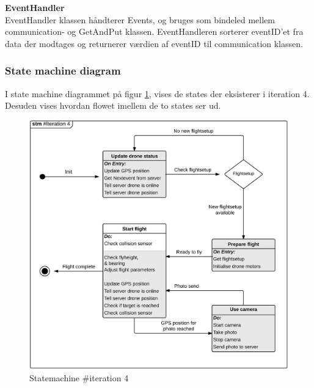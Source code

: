 \textbf{EventHandler} \\
EventHandler klassen håndterer Events, og bruges som bindeled mellem communication- og GetAndPut klassen. EventHandleren sorterer eventID'et fra data der modtages og returnerer værdien af eventID til communication klassen. 

\newpage

\subsubsection*{State machine diagram}
\vspace{-0.2cm}

I state machine diagrammet på figur \ref{fig:Statemachine_iteration4}, vises de states der eksisterer i iteration 4. Desuden vises hvordan flowet imellem de to states ser ud.


\begin{figure}[H]
	\centering
	\includegraphics[width=1\textwidth]{Billeder/statemachine/State_iteration4.png}
	\vspace{-0.5cm}
	\caption{Statemachine \#iteration 4}
	\label{fig:Statemachine_iteration4}
\end{figure}